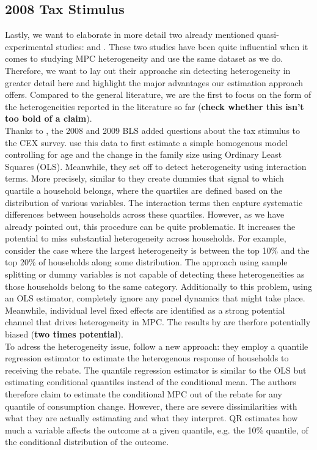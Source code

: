\subsection{2008 Tax Stimulus}
Lastly, we want to elaborate in more detail two already mentioned quasi-experimental studies: \cite{parker_etal_13} and \cite{ms_14}. These two studies have been quite influential when it comes to studying MPC heterogeneity and use the same dataset as we do. Therefore, we want to lay out their approache sin detecting heterogeneity in greater detail here and highlight the major advantages our estimation approach offers. Compared to the general literature, we are the first to focus on the form of the heterogeneities reported in the literature so far (\textbf{check whether this isn't too bold of a claim}). \\
Thanks to \cite{parker_etal_13}, the 2008 and 2009 BLS added questions about the tax stimulus to the CEX survey. \cite{parker_etal_13} use this data to first estimate a simple homogenous model controlling for age and the change in the family size using Ordinary Least Squares (OLS). Meanwhile, they set off to detect heterogeneity using interaction terms. More precisely, similar to \cite{golosov_etal} they create dummies that signal to which quartile a household belongs, where the quartiles are defined based on the distribution of various variables. The interaction terms then capture systematic differences between households across these quartiles. However, as we have already pointed out, this procedure can be quite problematic. It increases the potential to miss substantial heterogeneity across households. For example, consider the case where the largest heterogeneity is between the top 10\% and the top 20\% of households along some distribution. The approach using sample splitting or dummy variables is not capable of detecting these heterogeneities as those households belong to the same category. Additionally to this problem, using an OLS estimator, \cite{parker_etal_13} completely ignore any panel dynamics that might take place. Meanwhile, individual level fixed effects are identified as a strong potential channel that drives heterogeneity in MPC. The results by \cite{parker_etal_13} are therfore potentially biased (\textbf{two times potential}). \\
To adress the heterogeneity issue, \cite{ms_14} follow a new approach: they employ a quantile regression estimator to estimate the heterogenous response of households to receiving the rebate. The quantile regression estimator is similar to the OLS but estimating conditional quantiles instead of the conditional mean. The authors therefore claim to estimate the conditional MPC out of the rebate for any quantile of consumption change. However, there are severe dissimilarities with what they are actually estimating and what they interpret. QR estimates how much a variable affects the outcome at a given quantile, e.g. the 10\% quantile, of the conditional distribution of the outcome. 

